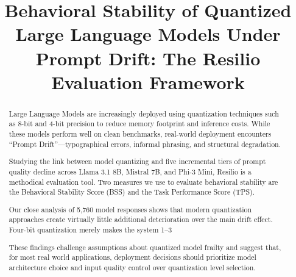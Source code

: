\documentclass[conference]{IEEEtran}
\begin{document}
\title{Behavioral Stability of Quantized Large Language Models Under Prompt Drift: The Resilio Evaluation Framework}

\author{
\and
{}
\and
{}
\and
{}
}

\maketitle

\begin{abstract}
Large Language Models are increasingly deployed using quantization techniques such as 8-bit and 4-bit precision to reduce memory footprint and inference costs. While these models perform well on clean benchmarks, real-world deployment encounters ``Prompt Drift''---typographical errors, informal phrasing, and structural degradation.

Studying the link between model quantizing and five incremental tiers of prompt quality decline across Llama 3.1 8B, Mistral 7B, and Phi-3 Mini, Resilio is a methodical evaluation tool. Two measures we use to evaluate behavioral stability are the Behavioral Stability Score (BSS) and the Task Performance Score (TPS).

Our close analysis of 5,760 model responses shows that modern quantization approaches create virtually little additional deterioration over the main drift effect. Four-bit quantization merely makes the system 1–3%

These findings challenge assumptions about quantized model frailty and suggest that, for most real world applications, deployment decisions should prioritize model architecture choice and input quality control over quantization level selection.
\end{abstract}
\end{document}
